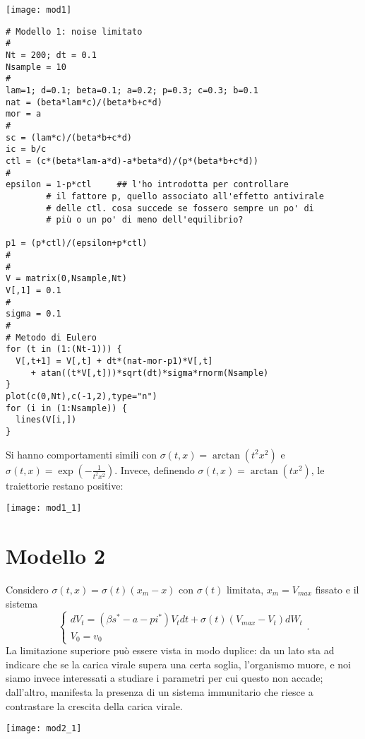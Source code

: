 \documentclass[12pt,a4paper,oneside]{amsart}
\theoremstyle{definition}
\begin{document}
\begin{center}
\texttt{[image: mod1]}
\end{center}

\begin{center}
\begin{verbatim}
# Modello 1: noise limitato
#
Nt = 200; dt = 0.1
Nsample = 10
#
lam=1; d=0.1; beta=0.1; a=0.2; p=0.3; c=0.3; b=0.1
nat = (beta*lam*c)/(beta*b+c*d)
mor = a
#
sc = (lam*c)/(beta*b+c*d)
ic = b/c
ctl = (c*(beta*lam-a*d)-a*beta*d)/(p*(beta*b+c*d))
#
epsilon = 1-p*ctl     ## l'ho introdotta per controllare  
		# il fattore p, quello associato all'effetto antivirale 
		# delle ctl. cosa succede se fossero sempre un po' di
		# più o un po' di meno dell'equilibrio?
	        
p1 = (p*ctl)/(epsilon+p*ctl)
#
#
V = matrix(0,Nsample,Nt)
V[,1] = 0.1
#
sigma = 0.1
#
# Metodo di Eulero
for (t in (1:(Nt-1))) {
  V[,t+1] = V[,t] + dt*(nat-mor-p1)*V[,t] 
     + atan((t*V[,t]))*sqrt(dt)*sigma*rnorm(Nsample)
}
plot(c(0,Nt),c(-1,2),type="n")
for (i in (1:Nsample)) {
  lines(V[i,])
}
\end{verbatim}
\end{center}

Si hanno comportamenti simili con $\sigma(t,x)=\arctan(t^2x^2)$ e $\sigma(t,x)=\exp(-\frac{1}{t^2x^2})$. Invece, definendo $\sigma(t,x)=\arctan(tx^2)$, le traiettorie restano positive:
\begin{center}
\texttt{[image: mod1\_1]}
\end{center}

\section{Modello 2}
Considero $\sigma(t,x)=\sigma(t)(x_m-x)$ con $\sigma(t)$ limitata, $x_m=V_{max}$ fissato e il sistema $$\begin{cases}
dV_t=\left(\beta s^* -a -p i^*\right)V_tdt + \sigma(t)(V_{max}-V_t)dW_t\\
V_0 = v_0
\end{cases}.$$
La limitazione superiore può essere vista in modo duplice: da un lato sta ad indicare che se la carica virale supera una certa soglia, l'organismo muore, e noi siamo invece interessati a studiare i parametri per cui questo non accade; dall'altro, manifesta la presenza di un sistema immunitario che riesce a contrastare la crescita della carica virale.

\begin{center}
\texttt{[image: mod2\_1]}
\end{center}
\end{document}
